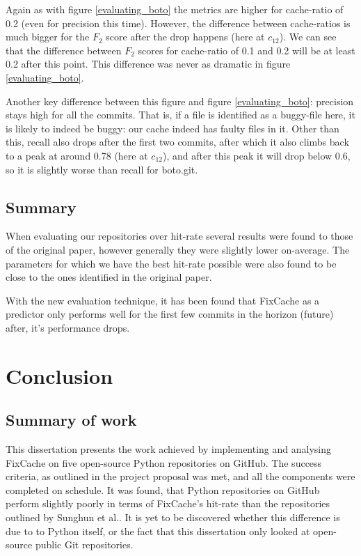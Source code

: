 \documentclass[12pt,twoside,notitlepage]{report}
\newcommand{\fxch}{FixCache}
\begin{document}
Again as with figure \ref{evaluating_boto} the metrics are higher for cache-ratio of 0.2 (even for precision this time). However, the difference between cache-ratios is much bigger for the $F_2$ score after the drop happens (here at $c_{12}$). We can see that the difference between $F_2$ scores for cache-ratio of 0.1 and 0.2 will be at least 0.2 after this point. This difference was never as dramatic in figure \ref{evaluating_boto}.

Another key difference between this figure and figure \ref{evaluating_boto}: precision stays high for all the commits. That is, if a file is identified as a buggy-file here, it is likely to indeed be buggy: our cache indeed has faulty files in it. Other than this, recall also drops after the first two commits, after which it also climbs back to a peak at around 0.78 (here at $c_{12}$), and after this peak it will drop below 0.6, so it is slightly worse than recall for boto.git.
\section{Summary}
When evaluating our repositories over hit-rate several results were found to those of the original paper, however generally they were slightly lower on-average. The parameters for which we have the best hit-rate possible were also found to be close to the ones identified in the original paper.

With the new evaluation technique, it has been found that \fxch{} as a predictor only performs well for the first few commits in the horizon (future) after, it's performance drops.
\cleardoublepage
\chapter{Conclusion}
\section{Summary of work}
This dissertation presents the work achieved by implementing and analysing \fxch{} on five open-source Python repositories on GitHub. The success criteria, as outlined in the project proposal was met, and all the components were completed on schedule. It was found, that Python repositories on GitHub perform slightly poorly in terms of \fxch{'s} hit-rate than the repositories outlined by Sunghun et al.\cite{FixCache}. It is yet to be discovered whether this difference is due to to Python itself, or the fact that this dissertation only looked at open-source public Git repositories.
\end{document}
